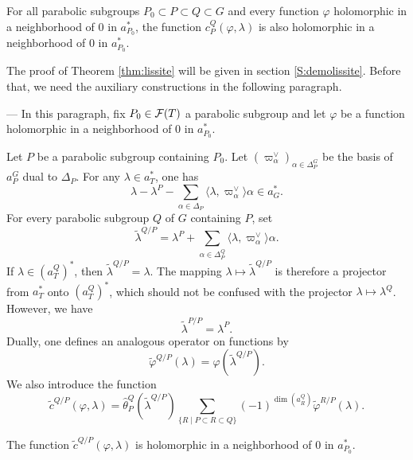 \begin{paragr}
\begin{theoreme}
    \label{thm:lissite}
For all parabolic subgroups $P_0\subset P\subset Q\subset G$ and every function $\varphi$ holomorphic in a neighborhood of $0$ in $a_{P_0}^*$, the function $c_P^Q(\varphi,\lambda)$ is also holomorphic in a neighborhood of $0$ in $a_{P_0}^*$.
\end{theoreme}

The proof of Theorem \ref{thm:lissite} will be given in section  \ref{S:demolissite}. Before that, we need the auxiliary constructions in the following paragraph.
\end{paragr}

\begin{paragr} --- In this paragraph, fix $P_0\in \mathcal{F}(T)$ a parabolic subgroup and let $\varphi$ be a function holomorphic in a neighborhood of $0$ in $a_{P_0}^*$.

Let $P$ be a parabolic subgroup containing $P_0$. Let $(\varpi_\alpha^{\vee})_{\alpha\in \Delta_P^G}$ be the basis of $a_P^G$ dual to $\Delta_P$. For any $\lambda\in a^{*}_T$, one has 
$$\lambda-\lambda^P-\sum_{\alpha \in \Delta_P} \langle \lambda, \varpi_\alpha^{\vee}   \rangle \alpha\in a_G^*.$$
For every parabolic subgroup $Q$ of $G$ containing $P$, set
$$\tilde{\lambda}^{Q/P}=\lambda^P+\sum_{\alpha \in \Delta_P^Q} \langle\lambda, \varpi_\alpha^{\vee}   \rangle \alpha.$$
If $\lambda\in (a^Q_T)^*$, then $\tilde{\lambda}^{Q/P}=\lambda$. The mapping $\lambda \mapsto \tilde{\lambda}^{Q/P}$ is therefore a projector from $a_T^*$ onto $(a^Q_T)^*$, which should not be confused with the projector $\lambda \mapsto \lambda^Q$. However, we have
$$\tilde{\lambda}^{P/P}=\lambda^P.$$
Dually, one defines an analogous operator on functions by
\begin{equation}
  \label{eq:phitilde}
  \tilde{\varphi}^{Q/P}(\lambda)=\varphi(\tilde{\lambda}^{Q/P}).
\end{equation}
We also introduce the function
\begin{equation}
  \label{eq:ctilde}
  \tilde{c}^{Q/P}(\varphi,\lambda)= \hat{\theta}_P^Q(\tilde{\lambda}^{Q/P}) \sum_{\{R\mid P\subset R\subset Q\}} (-1)^{\dim(a_R^Q)} \tilde{\varphi}^{R/P}(\lambda).
\end{equation}

\begin{lemme}\label{lem:lissite}
The function $\tilde{c}^{Q/P}(\varphi,\lambda)$ is holomorphic in a neighborhood of $0$ in $a_{P_0}^*$.
\end{lemme}


\end{paragr}
